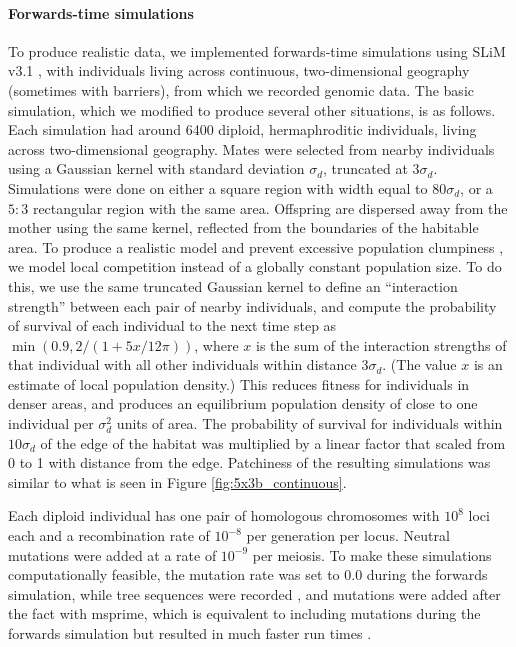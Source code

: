 \documentclass{article}
\begin{document}
\paragraph{Forwards-time simulations}
To produce realistic data, we implemented forwards-time simulations using SLiM v3.1 
\citep{haller2018forward,haller2018treesequence},
with individuals living across continuous, two-dimensional geography (sometimes with barriers),
from which we recorded genomic data.
The basic simulation, which we modified to produce several other situations,
is as follows.
Each simulation had around 6400 diploid, hermaphroditic individuals, 
living across two-dimensional geography.
Mates were selected from nearby individuals using a Gaussian kernel with standard deviation $\sigma_d$,
truncated at $3 \sigma_d$.
Simulations were done on either a square region with width equal to $80\sigma_d$,
or a $5:3$ rectangular region with the same area.
Offspring are dispersed away from the mother using the same kernel,
reflected from the boundaries of the habitable area.
To produce a realistic model and prevent excessive population clumpiness \citep{felsensten1975pain}, 
we model local competition instead of a globally constant population size.
To do this, 
we use the same truncated Gaussian kernel to define an ``interaction strength''
between each pair of nearby individuals, 
and compute the probability of survival of each individual to the next time step as
$\min(0.9, 2 / (1 +  5x/12 \pi))$,
where $x$ is the sum of the interaction strengths of that individual with all other individuals
within distance $3 \sigma_d$.
(The value $x$ is an estimate of local population density.)
This reduces fitness for individuals in denser areas,
and produces an equilibrium population density
of close to one individual per $\sigma_d^2$ units of area.
The probability of survival for individuals within $10\sigma_d$ of the edge of the habitat
was multiplied by a linear factor that scaled from 0 to 1 with distance from the edge.
Patchiness of the resulting simulations was similar to what is seen in 
Figure \ref{fig:5x3b_continuous}.

Each diploid individual has one pair of homologous chromosomes with $10^8$ loci each 
and a recombination rate of $10^{-8}$ per generation per locus.
Neutral mutations were added at a rate of $10^{-9}$ per meiosis.
To make these simulations computationally feasible,
the mutation rate was set to 0.0 during the forwards simulation,
while tree sequences were recorded \citep{haller2018treesequence},
and mutations were added after the fact with msprime,
which is equivalent to including mutations during the forwards simulation 
but resulted in much faster run times \citep{kelleher2018efficient}.
\end{document}
